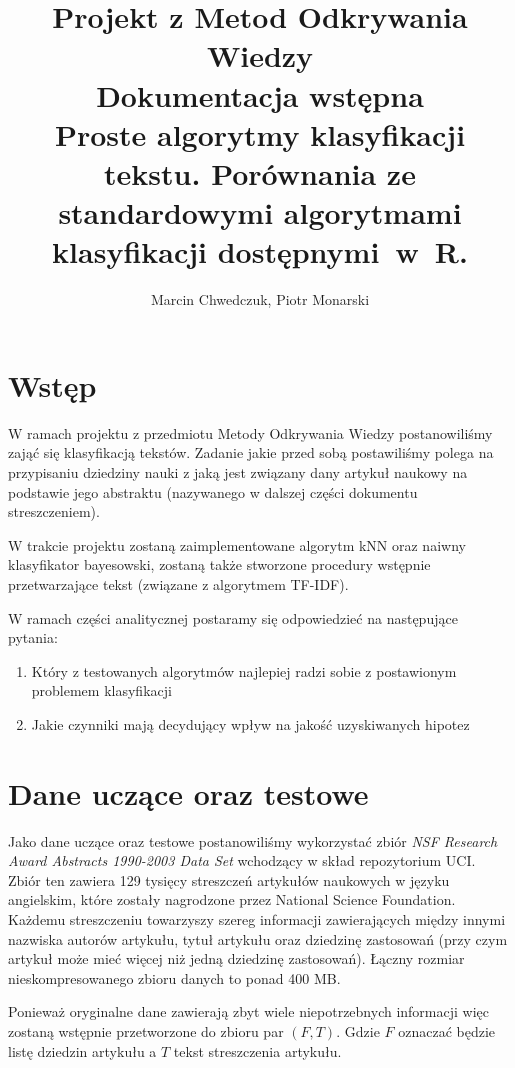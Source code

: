 \documentclass[a4paper,12pt]{article}
\title{Projekt z Metod Odkrywania Wiedzy\\Dokumentacja wstępna\\\Large{Proste algorytmy klasyfikacji tekstu. Porównania ze standardowymi algorytmami klasyfikacji dostępnymi~w~R.}\\}
\author{Marcin Chwedczuk, Piotr Monarski}
\date{}
\begin{document}
\maketitle

\section{Wstęp}

W ramach projektu z przedmiotu Metody Odkrywania Wiedzy 
postanowiliśmy zająć się klasyfikacją tekstów. 
Zadanie jakie przed sobą postawiliśmy polega na przypisaniu
dziedziny nauki z jaką jest związany dany artykuł naukowy
na podstawie jego abstraktu (nazywanego w dalszej części dokumentu
streszczeniem).

W trakcie projektu zostaną zaimplementowane
algorytm kNN oraz naiwny klasyfikator bayesowski,
zostaną także stworzone procedury wstępnie przetwarzające
tekst (związane z algorytmem TF-IDF).

W ramach części analitycznej postaramy się odpowiedzieć na
następujące pytania:
\begin{enumerate}
	\item
		Który z testowanych algorytmów 
		najlepiej radzi sobie z postawionym
		problemem klasyfikacji
	\item
		Jakie czynniki mają decydujący wpływ na jakość
		uzyskiwanych hipotez
\end{enumerate}

\section{Dane uczące oraz testowe}

	Jako dane uczące oraz testowe postanowiliśmy wykorzystać
	zbiór \textit{NSF Research Award Abstracts 1990-2003 Data Set}
	wchodzący w skład repozytorium UCI.
	Zbiór ten zawiera 129 tysięcy streszczeń artykułów naukowych 
	w języku angielskim,
	które zostały nagrodzone przez National Science Foundation.
	Każdemu streszczeniu towarzyszy szereg informacji zawierających
	między innymi nazwiska autorów artykułu, tytuł artykułu oraz
	dziedzinę zastosowań (przy czym artykuł może mieć więcej 
	niż jedną dziedzinę zastosowań).
	Łączny rozmiar nieskompresowanego zbioru danych to ponad 400 MB.
	
	Ponieważ oryginalne dane zawierają zbyt wiele 
	niepotrzebnych informacji
	więc zostaną wstępnie przetworzone do zbioru 
	par $(F, T)$. Gdzie $F$ oznaczać będzie listę dziedzin artykułu
	a $T$ tekst streszczenia artykułu.
	
\end{document}
